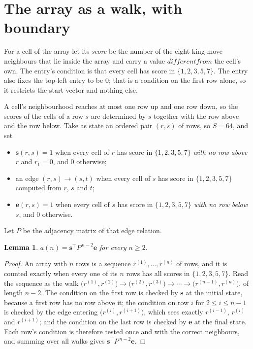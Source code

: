 \documentclass[11pt,a4paper]{article}
\theoremstyle{plain}
\newtheorem{lemma}[theorem]{Lemma}
\theoremstyle{definition}
\begin{document}
\section{The array as a walk, with boundary}

For a cell of the array let its \emph{score} be the number of the eight king-move neighbours that lie inside
the array and carry a value $different from$ the cell's own. The entry's condition is that every cell
has score in $\{1,2,3,5,7\}$. The entry also fixes the top-left entry to be $0$; that is a condition on the first row alone, so it restricts the start vector and nothing else.

A cell's neighbourhood reaches at most one row up and one row down, so the scores of the
cells of a row $s$ are determined by $s$ together with the row above and the row below.
Take as state an ordered pair $(r,s)$ of rows, so $S=64$, and set
\begin{itemize}
\item $\mathbf{s}(r,s)=1$ when every cell of $r$ has score in $\{1,2,3,5,7\}$ \emph{with no row
above $r$} and $r_1=0$, and $0$ otherwise;
\item an edge $(r,s)\to(s,t)$ when every cell of $s$ has score in $\{1,2,3,5,7\}$ computed from
$r$, $s$ and $t$;
\item $\mathbf{e}(r,s)=1$ when every cell of $s$ has score in $\{1,2,3,5,7\}$ \emph{with no row
below $s$}, and $0$ otherwise.
\end{itemize}
Let $P$ be the adjacency matrix of that edge relation.

\begin{lemma}\label{lem:walk}
$a(n)=\mathbf{s}^{\!\top}P^{\,n-2}\mathbf{e}$ for every $n\ge2$.
\end{lemma}

\begin{proof}
An array with $n$ rows is a sequence $r^{(1)},\dots,r^{(n)}$ of rows, and it is counted
exactly when every one of its $n$ rows has all scores in $\{1,2,3,5,7\}$. Read the sequence as the
walk $\bigl(r^{(1)},r^{(2)}\bigr)\to\bigl(r^{(2)},r^{(3)}\bigr)\to\cdots\to
\bigl(r^{(n-1)},r^{(n)}\bigr)$, of length $n-2$. The condition on the first row is
checked by $\mathbf{s}$ at the initial state, because a first row has no row above it; the
condition on row $i$ for $2\le i\le n-1$ is checked by the edge entering
$\bigl(r^{(i)},r^{(i+1)}\bigr)$, which sees exactly $r^{(i-1)}$, $r^{(i)}$ and
$r^{(i+1)}$; and the condition on the last row is checked by $\mathbf{e}$ at the final
state. Each row's condition is therefore tested once and with the correct neighbours, and
summing over all walks gives $\mathbf{s}^{\!\top}P^{\,n-2}\mathbf{e}$.
\end{proof}
\end{document}

